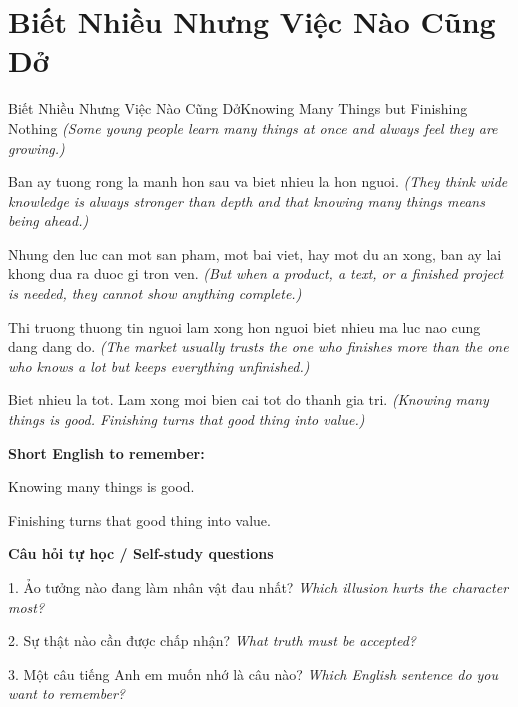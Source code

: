 \section{Biết Nhiều Nhưng Việc Nào Cũng Dở}
\begin{truyen}{Biết Nhiều Nhưng Việc Nào Cũng Dở}{Knowing Many Things but Finishing Nothing}
\textit{(Some young people learn many things at once and always feel they are growing.)}

Ban ay tuong rong la manh hon sau va biet nhieu la hon nguoi.
\textit{(They think wide knowledge is always stronger than depth and that knowing many things means being ahead.)}

Nhung den luc can mot san pham, mot bai viet, hay mot du an xong, ban ay lai khong dua ra duoc gi tron ven.
\textit{(But when a product, a text, or a finished project is needed, they cannot show anything complete.)}

Thi truong thuong tin nguoi lam xong hon nguoi biet nhieu ma luc nao cung dang dang do.
\textit{(The market usually trusts the one who finishes more than the one who knows a lot but keeps everything unfinished.)}

\end{truyen}

\begin{baihoc}
Biet nhieu la tot. Lam xong moi bien cai tot do thanh gia tri.
\textit{(Knowing many things is good. Finishing turns that good thing into value.)}
\end{baihoc}

\begin{ghinhoanh}
\textbf{Short English to remember:}

Knowing many things is good.

Finishing turns that good thing into value.

\end{ghinhoanh}

\begin{tuhocnhanh}
\textbf{Câu hỏi tự học / Self-study questions}

1. Ảo tưởng nào đang làm nhân vật đau nhất? \textit{Which illusion hurts the character most?}

2. Sự thật nào cần được chấp nhận? \textit{What truth must be accepted?}

3. Một câu tiếng Anh em muốn nhớ là câu nào? \textit{Which English sentence do you want to remember?}
\end{tuhocnhanh}
\ngancach

